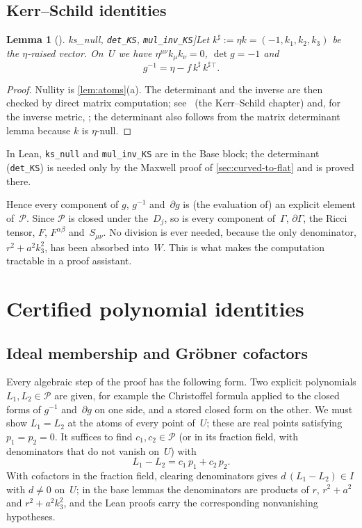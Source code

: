 \documentclass[11pt]{article}
\newtheorem{lemma}[theorem]{Lemma}
\theoremstyle{definition}
\theoremstyle{remark}
\newcommand{\lean}[1]{\lstinline[basicstyle=\ttfamily\normalsize,columns=fullflexible,breaklines=false]{#1}}
\newcommand{\ksharp}{k^{\sharp}}
\begin{document}
\subsection{Kerr--Schild identities}

\begin{lemma}[\lean{ks_null}, \lean{det_KS}, \lean{mul_inv_KS}]\label{lem:ks}
Let $\ksharp:=\eta k=(-1,k_1,k_2,k_3)$ be the $\eta$-raised vector.
On~$U$ we have $\eta^{\mu\nu}k_\mu k_\nu=0$, $\det g=-1$ and
\[
  g^{-1}=\eta-f\,\ksharp\,\ksharp{}^{\!\top}.
\]
\end{lemma}
\begin{proof}
Nullity is \cref{lem:atoms}(a).
The determinant and the inverse are then checked by direct matrix computation; see~\cite{stephani2003} (the Kerr--Schild chapter) and, for the inverse metric, \cite{gurses1975}; the determinant also follows from the matrix determinant lemma because $k$ is $\eta$-null.
\end{proof}
In Lean, \lean{ks_null} and \lean{mul_inv_KS} are in the Base block; the determinant (\lean{det_KS}) is needed only by the Maxwell proof of \cref{sec:curved-to-flat} and is proved there.

Hence every component of $g$, $g^{-1}$ and~$\partial g$ is (the evaluation of) an explicit element of~$\mathcal P$.
Since $\mathcal P$ is closed under the~$D_j$, so is every component of~$\Gamma$, $\partial\Gamma$, the Ricci tensor, $F$, $F^{\alpha\beta}$ and~$S_{\mu\nu}$.
No division is ever needed, because the only denominator, $r^2+a^2k_3^2$, has been absorbed into~$W$.
This is what makes the computation tractable in a proof assistant.

\section{Certified polynomial identities}\label{sec:certificates}

\subsection{Ideal membership and Gr\"obner cofactors}

Every algebraic step of the proof has the following form.
Two explicit polynomials $L_1,L_2\in\mathcal P$ are given, for example the Christoffel formula applied to the closed forms of $g^{-1}$ and~$\partial g$ on one side, and a stored closed form on the other.
We must show $L_1=L_2$ at the atoms of every point of~$U$; these are real points satisfying $p_1=p_2=0$.
It suffices to find $c_1,c_2\in\mathcal P$ (or in its fraction field, with denominators that do not vanish on~$U$) with
\begin{equation}\label{eq:cert}
  L_1-L_2=c_1\,p_1+c_2\,p_2 .
\end{equation}
With cofactors in the fraction field, clearing denominators gives $d\,(L_1-L_2)\in I$ with $d\neq0$ on~$U$; in the base lemmas the denominators are products of $r$, $r^2+a^2$ and $r^2+a^2k_3^2$, and the Lean proofs carry the corresponding nonvanishing hypotheses.
\end{document}
